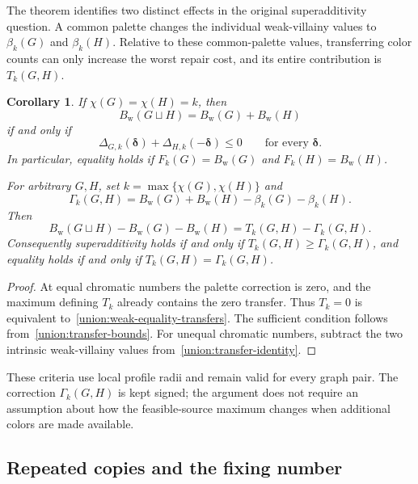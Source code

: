 \documentclass[11pt,reqno]{amsart}
\numberwithin{equation}{section}
\newtheorem{corollary}[theorem]{Corollary}
\theoremstyle{definition}
\theoremstyle{remark}
\begin{document}
The theorem identifies two distinct effects in the original
superadditivity question.  A common palette changes the individual
weak-villainy values to $\beta_k(G)$ and $\beta_k(H)$.  Relative to
these common-palette values, transferring color counts can only
increase the worst repair cost, and its entire contribution is
$T_k(G,H)$.

\begin{corollary}\label{union:weak-equality-general}
If $\chi(G)=\chi(H)=k$, then
\[
 B_{\mathrm w}(G\sqcup H)=B_{\mathrm w}(G)+B_{\mathrm w}(H)
\]
if and only if
\begin{equation}\label{union:weak-equality-transfers}
 \Delta_{G,k}(\boldsymbol\delta)
 +\Delta_{H,k}(-\boldsymbol\delta)\le0
 \qquad\text{for every }\boldsymbol\delta.
\end{equation}
In particular, equality holds if
$F_k(G)=B_{\mathrm w}(G)$ and $F_k(H)=B_{\mathrm w}(H)$.

For arbitrary $G,H$, set $k=\max\{\chi(G),\chi(H)\}$ and
\[
 \Gamma_k(G,H)=B_{\mathrm w}(G)+B_{\mathrm w}(H)
                   -\beta_k(G)-\beta_k(H).
\]
Then
\begin{equation}\label{union:weak-defect-general}
 B_{\mathrm w}(G\sqcup H)-B_{\mathrm w}(G)-B_{\mathrm w}(H)
 =T_k(G,H)-\Gamma_k(G,H).
\end{equation}
Consequently superadditivity holds if and only if
$T_k(G,H)\ge\Gamma_k(G,H)$, and equality holds if and only if
$T_k(G,H)=\Gamma_k(G,H)$.
\end{corollary}

\begin{proof}
At equal chromatic numbers the palette correction is zero, and the
maximum defining $T_k$ already contains the zero transfer.  Thus
$T_k=0$ is equivalent to~\eqref{union:weak-equality-transfers}.
The sufficient condition follows from~\eqref{union:transfer-bounds}.
For unequal chromatic numbers, subtract the two intrinsic weak-villainy
values from~\eqref{union:transfer-identity}.
\end{proof}

These criteria use local profile radii and remain valid for every
graph pair.  The correction $\Gamma_k(G,H)$ is kept signed; the
argument does not require an assumption about how the feasible-source
maximum changes when additional colors are made available.

\subsection{Repeated copies and the fixing number}
\label{union:repeated-copies}
\end{document}
